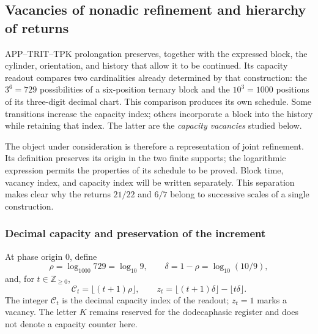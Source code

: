 \subsection{Vacancies of nonadic refinement and hierarchy of returns}
\label{vac-add-seccion}

APP--TRIT--TPK prolongation preserves, together with the expressed block, the cylinder, orientation, and history that allow it to be continued. Its capacity readout compares two cardinalities already determined by that construction: the \(3^6=729\) possibilities of a six-position ternary block and the \(10^3=1000\) positions of its three-digit decimal chart. This comparison produces its own schedule. Some transitions increase the capacity index; others incorporate a block into the history while retaining that index. The latter are the \emph{capacity vacancies} studied below.

The object under consideration is therefore a representation of joint refinement. Its definition preserves its origin in the two finite supports; the logarithmic expression permits the properties of its schedule to be proved. Block time, vacancy index, and capacity index will be written separately. This separation makes clear why the returns \(21/22\) and \(6/7\) belong to successive scales of a single construction.

\subsubsection{Decimal capacity and preservation of the increment}
\label{vac-add-capacidad}

\begin{definition}
\label{vac-add-definicion}
At phase origin \(0\), define
\begin{equation}
 \rho=\log_{1000}729=\log_{10}9,
 \qquad \delta=1-\rho=\log_{10}(10/9),
 \label{vac-add-densidad}
\end{equation}
and, for \(t\in\mathbb Z_{\geq0}\),
\begin{equation}
 \mathcal C_t=\lfloor(t+1)\rho\rfloor,
 \qquad
 z_t=\lfloor(t+1)\delta\rfloor-\lfloor t\delta\rfloor.
 \label{vac-add-indices}
\end{equation}
The integer \(\mathcal C_t\) is the decimal capacity index of the readout; \(z_t=1\) marks a vacancy. The letter \(K\) remains reserved for the dodecaphasic register and does not denote a capacity counter here.
\end{definition}


